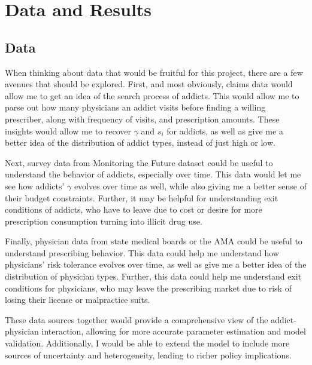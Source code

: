 \documentclass[11pt,a4paper]{article}
\begin{document}
\section{Data and Results}
\label{sec:results}

\subsection{Data}
\label{sec:data}

When thinking about data that would be fruitful for this project, there are a few avenues that should be explored. First, and most obviously, claims data would allow me to get an idea of the search process of addicts. This would allow me to parse
out how many physicians an addict visits before finding a willing prescriber, along with frequency of visits, and prescription amounts. These insights would allow me to recover $\gamma$ and $s_i$ for addicts, as well as give me a better idea of the 
distribution of addict types, instead of just high or low.

Next, survey data from Monitoring the Future dataset could be useful to understand the behavior of addicts, especially over time. This data would let me see how addicts' $\gamma$ evolves over time as well, while also giving me a better sense of their budget constraints.
Further, it may be helpful for understanding exit conditions of addicts, who have to leave due to cost or desire for more prescription consumption turning into illicit drug use.

Finally, physician data from state medical boards or the AMA could be useful to understand prescribing behavior. This data could help me understand how physicians' risk tolerance evolves over time, as well as give me a better idea of the distribution of
physician types. Further, this data could help me understand exit conditions for physicians, who may leave the prescribing market due to risk of losing their license or malpractice suits.

These data sources together would provide a comprehensive view of the addict-physician interaction, allowing for more accurate parameter estimation and model validation. Additionally, I would be able to extend the model to include more sources of 
uncertainty and heterogeneity, leading to richer policy implications.
\end{document}

